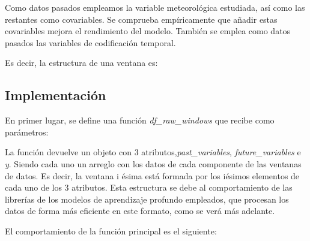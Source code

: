 Como datos pasados empleamos la variable meteorológica estudiada, así como las restantes como covariables. Se comprueba empíricamente que 
añadir estas covariables mejora el rendimiento del modelo. También se emplea como datos pasados las variables de codificación temporal. 

Es decir, la estructura de una ventana es:

\subsection{Implementación}
En primer lugar, se define una función \textit{df\_raw\_windows} que recibe como parámetros:

La función devuelve un objeto con 3 atributos,\textit{past\_variables}, \textit{future\_variables} e \textit{y}.
Siendo cada uno un arreglo con los datos de cada componente de las ventanas de datos. Es decir, la ventana i ésima
está formada por los iésimos elementos de cada uno de los 3 atributos. Esta estructura se debe al comportamiento
de las librerías de los modelos de aprendizaje profundo empleados, que procesan los datos de forma más eficiente en este formato,
como se verá más adelante.

\bigskip
El comportamiento de la función principal es el siguiente:

